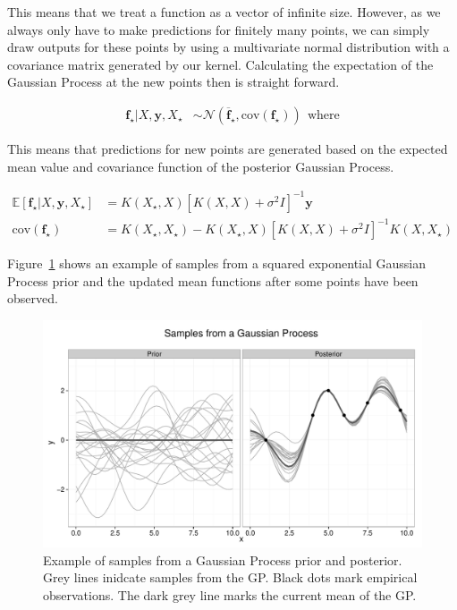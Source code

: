 \documentclass[authoryear,11pt,review]{elsarticle}
\begin{document}
This means that we treat a function as a vector of infinite size. However, as we always only have to make predictions for finitely many points, we can simply draw outputs for these points by using a multivariate normal distribution with a covariance matrix generated by our kernel. Calculating the expectation of the Gaussian Process at the new points then is straight forward.

\begin{align*}
\mathbf{f}_\star|X,\mathbf{y},X_\star &\sim \mathcal{N}(\overline{\mathbf{f}}_\star, \text{cov}(\mathbf{f}_\star))~~\text{where}
\end{align*}

This means that predictions for new points are generated based on the expected mean value and covariance function of the posterior Gaussian Process. 

\begin{align*}
\mathbb{E}[\mathbf{f}_\star|X,\mathbf{y},X_\star]&=K(X_\star,X)[K(X,X)+\sigma^2I]^{-1}\mathbf{y} \\
\text{cov}(\mathbf{f}_\star)&=K(X_\star,X_\star)-K(X_\star,X)[K(X,X)+\sigma^2I]^{-1}K(X,X_\star)
\end{align*}

Figure~\ref{fig:gpexample} shows an example of samples from a squared exponential Gaussian Process prior and the updated mean functions after some points have been observed.

\begin{figure}[ht]
\includegraphics[scale=0.5]{figs/gpexample.pdf}
\caption{Example of samples from a Gaussian Process prior and posterior. Grey lines inidcate samples from the GP. Black dots mark empirical observations. The dark grey line marks the current mean of the GP.}
\label{fig:gpexample}
\end{figure}
\end{document}
